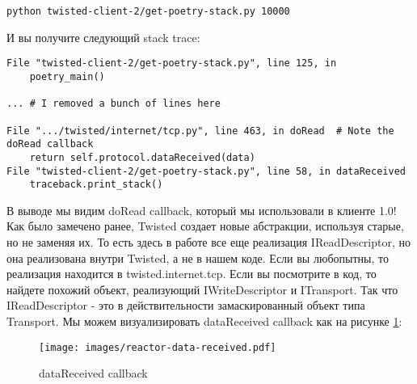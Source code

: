  \begin{verbatim}
python twisted-client-2/get-poetry-stack.py 10000
\end{verbatim} 

И вы получите следующий stack trace:

 \begin{verbatim}
File "twisted-client-2/get-poetry-stack.py", line 125, in
    poetry_main()

... # I removed a bunch of lines here

File ".../twisted/internet/tcp.py", line 463, in doRead  # Note the doRead callback
    return self.protocol.dataReceived(data)
File "twisted-client-2/get-poetry-stack.py", line 58, in dataReceived
    traceback.print_stack()
\end{verbatim} 


В выводе мы видим doRead callback, который мы использовали в клиенте 1.0! 
Как было замечено ранее, Twisted создает новые абстракции, используя 
старые, но не заменяя их. То есть здесь в работе все еще реализация IReadDescriptor, 
но она реализована внутри Twisted, а не в нашем коде. Если вы любопытны, то 
реализация находится в twisted.internet.tcp. Если вы посмотрите в код, то найдете 
похожий объект, реализующий IWriteDescriptor и ITransport. Так что IReadDescriptor - 
это в действительности замаскированный объект типа Transport. Мы можем визуализировать 
dataReceived callback как на рисунке \ref{fig:reactor-data-received}:

\begin{figure}[h]
\begin{center}
    \texttt{[image: images/reactor-data-received.pdf]}
    \caption{dataReceived callback\label{fig:reactor-data-received}}
\end{center}
\end{figure}

